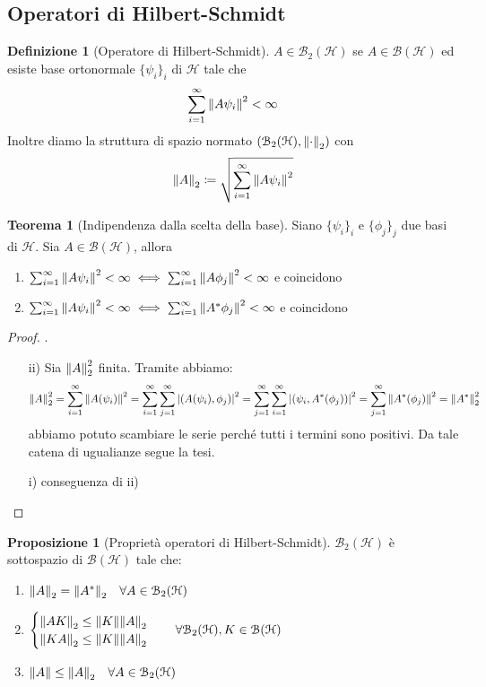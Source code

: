 \documentclass[a4paper,10pt]{article}
\theoremstyle{definition}
\newcommand{\hil}{\mathcal{H}} %
\theoremstyle{indentdefinition}
\newtheorem{defn}{Definizione}[section]
\theoremstyle{indenttheorem}
\newtheorem{thm}{Teorema}
\newtheorem{prop}{Proposizione}
\theoremstyle{myremark}
\theoremstyle{indentgeneral}
\newenvironment{myboxed} 
{\noindent\begin{lrbox}{\mybox}\begin{minipage}{\textwidth}}
{\end{minipage}\end{lrbox}\fbox{\usebox{\mybox}}}
\begin{document}
\subsection{Operatori di Hilbert-Schmidt}
\begin{defn}[Operatore di Hilbert-Schmidt]
    $A\in\mathcal{B}_2(\hil)$ se $A\in\mathcal{B}(\hil)$ ed esiste base ortonormale $\{\psi_i\}_i$ di $\hil$ tale che 
    $$\sum_{i=1}^\infty\norm{A\psi_i}^2<\infty$$
    Inoltre diamo la struttura di spazio normato $(\mathcal{B}_2(\hil), \norm{\cdot}_2)$ con 
    $$\norm{A}_2\coloneqq\sqrt{\sum_{i=1}^\infty\norm{A\psi_i}^2}$$
\end{defn}

\begin{myboxed}
\begin{thm}[Indipendenza dalla scelta della base]
    Siano $\{\psi_i\}_i$ e $\{\phi_j\}_j$ due basi di $\hil$. Sia $A\in\mathcal{B}(\hil)$, allora
    \begin{enumerate}
        \item $\sum_{i=1}^\infty\norm{A\psi_i}^2<\infty\iff\sum_{i=1}^\infty\norm{A\phi_j}^2<\infty$ e coincidono
        \item $\sum_{i=1}^\infty\norm{A\psi_i}^2<\infty\iff\sum_{i=1}^\infty\norm{A^*\phi_j}^2<\infty$ e coincidono
    \end{enumerate}
\end{thm}
\end{myboxed}
\begin{proof}
.
\begin{itemize}
    \item[ii)] Sia $\norm{A}_2^2$ finita. Tramite  abbiamo:
    $$\norm{A}_2^2=\sum_{i=1}^\infty\norm{A(\psi_i)}^2=\sum_{i=1}^\infty\sum_{j=1}^\infty\abs{(A(\psi_i),\phi_j)}^2=\sum_{j=1}^\infty\sum_{i=1}^\infty\abs{(\psi_i, A^*(\phi_j))}^2=\sum_{j=1}^\infty\norm{A^*(\phi_j)}^2=\norm{A^*}_2^2$$
    abbiamo potuto scambiare le serie perché tutti i termini sono positivi. Da tale catena di ugualianze segue la tesi.
    \item[i)] conseguenza di ii)
\end{itemize}
\end{proof}

\begin{prop}[Proprietà operatori di Hilbert-Schmidt]\label{thm-prop-op-hil-schmidt}
    $\mathcal{B}_2(\hil)$ è sottospazio di $\mathcal{B}(\hil)$ tale che:
    \begin{enumerate}
        \item $\norm{A}_2=\norm{A^*}_2\quad \forall A\in \mathcal{B}_2(\hil)$
        \item $\begin{cases}
            \norm{AK}_2\le \norm{K}\norm{A}_2\\
             \norm{KA}_2\le \norm{K}\norm{A}_2
        \end{cases}\quad \forall \mathcal{B}_2(\hil), K\in \mathcal{B}(\hil)$
        \item $\norm{A}\le \norm{A}_2\quad \forall A\in \mathcal{B}_2(\hil)$
    \end{enumerate}
\end{prop}
\end{document}
